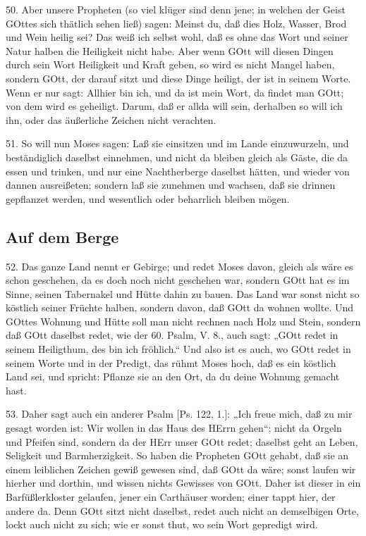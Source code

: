 50. Aber unsere Propheten (so viel klüger sind denn jene; in welchen der Geist GOttes sich thätlich sehen ließ) sagen: Meinst du, daß dies Holz, Wasser, Brod und Wein heilig sei? Das weiß ich selbst wohl, daß es ohne das Wort und seiner Natur halben die Heiligkeit nicht habe. Aber wenn GOtt will diesen Dingen durch sein Wort Heiligkeit und Kraft geben, so wird es nicht Mangel haben, sondern GOtt, der darauf sitzt und diese Dinge heiligt, der ist in seinem Worte. Wenn er nur sagt: Allhier bin ich, und da ist mein Wort, da findet man GOtt; von dem wird es geheiligt. Darum, daß er allda will sein, derhalben so will ich ihn, oder das äußerliche Zeichen nicht verachten.

51. So will nun Moses sagen: Laß sie einsitzen und im Lande einzuwurzeln, und beständiglich daselbst einnehmen, und nicht da bleiben gleich als Gäste, die da essen und trinken, und nur eine Nachtherberge daselbst hätten, und wieder von dannen ausreißeten; sondern laß sie zunehmen und wachsen, daß sie drinnen gepflanzet werden, und wesentlich oder beharrlich bleiben mögen.

\subsection{Auf dem Berge}

52. Das ganze Land nennt er Gebirge; und redet Moses davon, gleich als wäre es schon geschehen, da es doch noch nicht geschehen war, sondern GOtt hat es im Sinne, seinen Tabernakel und Hütte dahin zu bauen. Das Land war sonst nicht so köstlich seiner Früchte halben, sondern davon, daß GOtt da wohnen wollte. Und GOttes Wohnung und Hütte soll man nicht rechnen nach Holz und Stein, sondern daß GOtt daselbst redet, wie der 60. Psalm, V. 8., auch sagt: „GOtt redet in seinem Heiligthum, des bin ich fröhlich.“ Und also ist es auch, wo GOtt redet in seinem Worte und in der Predigt, das rühmt Moses hoch, daß es ein köstlich Land sei, und spricht: Pflanze sie an den Ort, da du deine Wohnung gemacht hast.

53. Daher sagt auch ein anderer Psalm [Ps. 122, 1.]: „Ich freue mich, daß zu mir gesagt worden ist: Wir wollen in das Haus des HErrn gehen“; nicht da Orgeln und Pfeifen sind, sondern da der HErr unser GOtt redet; daselbst geht an Leben, Seligkeit und Barmherzigkeit. So haben die Propheten GOtt gehabt, daß sie an einem leiblichen Zeichen gewiß gewesen sind, daß GOtt da wäre; sonst laufen wir hierher und dorthin, und wissen nichts Gewisses von GOtt. Daher ist dieser in ein Barfüßlerkloster gelaufen, jener ein Carthäuser worden; einer tappt hier, der andere da. Denn GOtt sitzt nicht daselbst, redet auch nicht an demselbigen Orte, lockt auch nicht zu sich; wie er sonst thut, wo sein Wort gepredigt wird.

